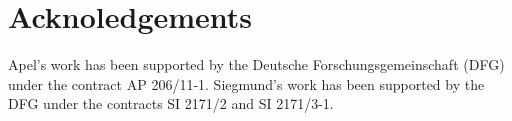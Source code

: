 \documentclass[sigconf]{acmart}
\begin{document}
	\section{Acknoledgements}
	Apel’s work has been supported by the Deutsche Forschungsgemeinschaft (DFG) under the contract AP 206/11-1. Siegmund’s work has been supported by the DFG under the
    contracts SI 2171/2 and SI 2171/3-1.
	
	\clearpage

	
	
	\clearpage
\end{document}
